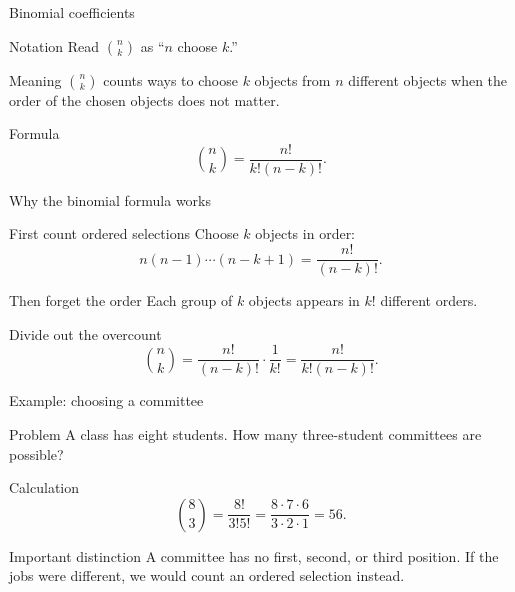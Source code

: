 \documentclass{beamer}
\begin{document}
\begin{frame}{Binomial coefficients}
\small
  \begin{block}{Notation}
    Read $\binom{n}{k}$ as ``$n$ choose $k$.''
  \end{block}
\pause
  \begin{block}{Meaning}
    $\binom{n}{k}$ counts ways to choose $k$ objects from $n$ different objects
    when the order of the chosen objects does not matter.
  \end{block}
\pause
  \begin{block}{Formula}
    \[
       \boxed{\binom{n}{k}=\frac{n!}{k!(n-k)!}}.
    \]
  \end{block}
\end{frame}

\begin{frame}{Why the binomial formula works}
\small
  \begin{block}{First count ordered selections}
    Choose $k$ objects in order:
    \[
       n(n-1)\cdots(n-k+1)=\frac{n!}{(n-k)!}.
    \]
  \end{block}
\pause
  \begin{block}{Then forget the order}
    Each group of $k$ objects appears in $k!$ different orders.
  \end{block}
\pause
  \begin{block}{Divide out the overcount}
    \[
       \binom{n}{k}
       =\frac{n!}{(n-k)!}\cdot\frac{1}{k!}
       =\frac{n!}{k!(n-k)!}.
    \]
  \end{block}
\end{frame}

\begin{frame}{Example: choosing a committee}
  \begin{block}{Problem}
    A class has eight students.  How many three-student committees are possible?
  \end{block}
\pause
  \begin{block}{Calculation}
    \[
      \binom{8}{3}=\frac{8!}{3!5!}
      =\frac{8\cdot7\cdot6}{3\cdot2\cdot1}=56.
    \]
  \end{block}
\pause
  \begin{block}{Important distinction}
    A committee has no first, second, or third position.  If the jobs were
    different, we would count an ordered selection instead.
  \end{block}
\end{frame}
\end{document}
